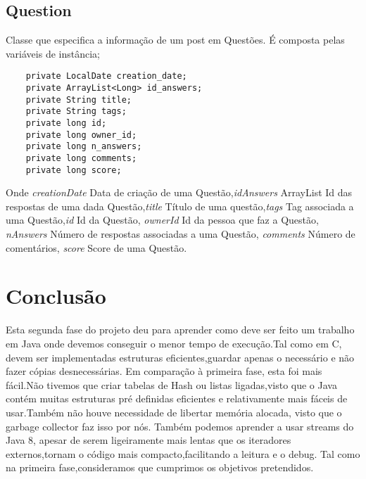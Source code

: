\documentclass[letterpaper, 10 pt, conference]{IEEEtran}  %
\begin{document}
 \subsection{Question}

 Classe que especifica a informação de um post em Questões.
 \newline
 É composta pelas variáveis de instância;

  \begin{lstlisting}
    private LocalDate creation_date;
    private ArrayList<Long> id_answers;
    private String title;
    private String tags;
    private long id;
    private long owner_id;
    private long n_answers;
    private long comments;
    private long score;
  \end{lstlisting}

  Onde \textit{creationDate} Data de criação de uma Questão,\textit{idAnswers} ArrayList Id das respostas de uma dada Questão,\textit{title} Título de uma questão,\textit{tags} Tag associada a uma Questão,\textit{id} Id da Questão, \textit{ownerId} Id da pessoa que faz a Questão, \textit{nAnswers} Número de respostas associadas a uma Questão, \textit{comments} Número de comentários, \textit{score} Score de uma Questão.

\section{Conclusão}

Esta segunda fase do projeto deu para aprender como deve ser feito um trabalho em Java onde devemos conseguir o menor tempo de execução.Tal como em C, devem ser implementadas estruturas eficientes,guardar apenas o necessário e não fazer cópias desnecessárias.
\newline
Em comparação à primeira fase, esta foi mais fácil.Não tivemos que criar tabelas de Hash ou listas ligadas,visto que o Java contém muitas estruturas pré definidas eficientes e relativamente mais fáceis de usar.Também não houve necessidade de libertar memória alocada, visto que o garbage collector faz isso por nós.
\newline
Também podemos aprender a usar streams do Java 8, apesar de serem ligeiramente mais lentas que os iteradores externos,tornam o código mais compacto,facilitando a leitura e o debug.
\newline
Tal como na primeira fase,consideramos que cumprimos os objetivos pretendidos.



\addtolength{\textheight}{-12cm}   %
\end{document}
